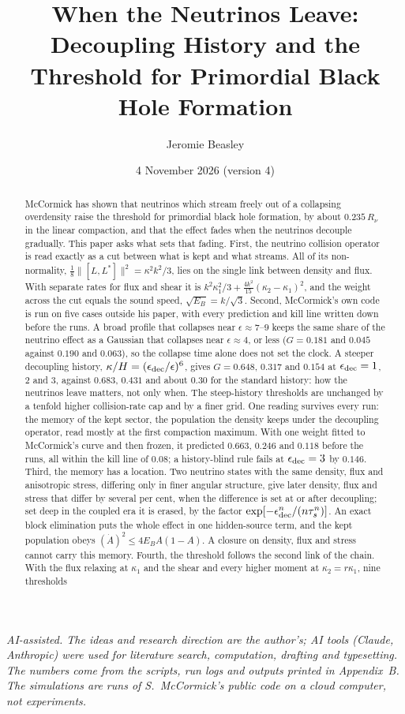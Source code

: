 \documentclass[11pt]{article}
\title{When the Neutrinos Leave:\\ Decoupling History and the Threshold for Primordial Black Hole Formation}
\author{Jeromie Beasley}
\date{4 November 2026 \quad (version 4)}
\begin{document}
\maketitle

\noindent\emph{AI-assisted. The ideas and research direction are the author's; AI tools (Claude, Anthropic) were used for literature search, computation, drafting and typesetting. The numbers come from the scripts, run logs and outputs printed in Appendix~B. The simulations are runs of S.~McCormick's public code on a cloud computer, not experiments.}

\begin{abstract}
McCormick has shown that neutrinos which stream freely out of a collapsing overdensity raise the threshold for primordial black hole formation, by about $0.235\,R_\nu$ in the linear compaction, and that the effect fades when the neutrinos decouple gradually. This paper asks what sets that fading. First, the neutrino collision operator is read exactly as a cut between what is kept and what streams. All of its non-normality, $\tfrac18\lVert[L,L^\ast]\rVert^2=\kappa^2k^2/3$, lies on the single link between density and flux. With separate rates for flux and shear it is $k^2\kappa_1^2/3+\tfrac{4k^2}{15}(\kappa_2-\kappa_1)^2$, and the weight across the cut equals the sound speed, $\sqrt{E_B}=k/\sqrt3$. Second, McCormick's own code is run on five cases outside his paper, with every prediction and kill line written down before the runs. A broad profile that collapses near $\epsilon\approx7$--$9$ keeps the same share of the neutrino effect as a Gaussian that collapses near $\epsilon\approx4$, or less ($G=0.181$ and $0.045$ against $0.190$ and $0.063$), so the collapse time alone does not set the clock. A steeper decoupling history, $\kappa/H=(\epsilon_{\rm dec}/\epsilon)^6$, gives $G=0.648$, $0.317$ and $0.154$ at $\epsilon_{\rm dec}=1$, $2$ and $3$, against $0.683$, $0.431$ and about $0.30$ for the standard history: how the neutrinos leave matters, not only when. The steep-history thresholds are unchanged by a tenfold higher collision-rate cap and by a finer grid. One reading survives every run: the memory of the kept sector, the population the density keeps under the decoupling operator, read mostly at the first compaction maximum. With one weight fitted to McCormick's curve and then frozen, it predicted $0.663$, $0.246$ and $0.118$ before the runs, all within the kill line of $0.08$; a history-blind rule fails at $\epsilon_{\rm dec}=3$ by $0.146$. Third, the memory has a location. Two neutrino states with the same density, flux and anisotropic stress, differing only in finer angular structure, give later density, flux and stress that differ by several per cent, when the difference is set at or after decoupling; set deep in the coupled era it is erased, by the factor $\exp[-\epsilon_{\rm dec}^n/(n\tau_s^n)]$. An exact block elimination puts the whole effect in one hidden-source term, and the kept population obeys $(\dot A)^2\le4E_BA(1-A)$. A closure on density, flux and stress cannot carry this memory. Fourth, the threshold follows the second link of the chain. With the flux relaxing at $\kappa_1$ and the shear and every higher moment at $\kappa_2=r\kappa_1$, nine thresholds 
\end{abstract}
\end{document}
